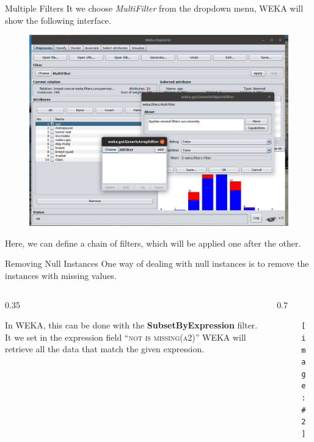 \documentclass{beamer}
\newcommand{\cols}[4]{
	\begin{columns}[t]
	\begin{column}{#1\textwidth}
		#3
	\end{column}
	\begin{column}{#2\textwidth}
		#4
	\end{column}
	\end{columns}
	
}
\newcommand{\fig}[2]{
	\begin{figure}[!h]
	\texttt{[image: \#2]}
	\end{figure}
}
\begin{document}
\begin{frame}{Multiple Filters}
It we choose \textit{MultiFilter} from the dropdown menu, WEKA will
show the following interface. 
\begin{figure}
\includegraphics[scale=0.2]{img/chain.png}
\end{figure}
Here, we can define a chain of filters, which will be applied one after the
other.
\end{frame}

\begin{frame}[t]{Removing Null Instances}
One way of dealing with null instances is to remove
the instances with missing values.
\vskip 0.3cm
\cols{0.35}{0.7}{
In WEKA, this can be done with the
\textbf{SubsetByExpression} filter.
It we set in the expression field ``\textsc{not is missing(a2)}''
WEKA will retrieve all the data that match the given expression.
}
{
\fig{0.2}{img/missing_null.png}
}
\end{frame}
\end{document}
